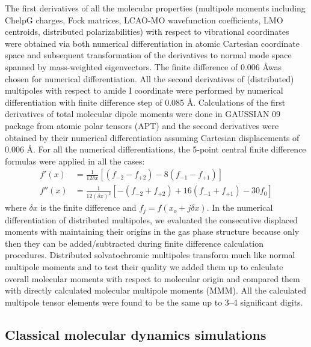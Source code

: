 \documentclass[a4paper,titlepage,twoside,fleqn,12pt]{book}
\begin{document}
\begin{appendices}
\begin{refsection}
The first derivatives of all the molecular properties
(multipole moments including ChelpG charges, Fock matrices, LCAO\hyp{}MO
wavefunction coefficients, LMO centroids, distributed polarizabilities)
with respect to
vibrational coordinates were obtained via both numerical differentiation
in atomic Cartesian coordinate space and subsequent
transformation of the derivatives to normal mode space
spanned by mass\hyp{}weighted eigenvectors. The finite difference
of 0.006 \AA was chosen for numerical differentiation. All the
second derivatives of (distributed) multipoles with respect to
amide I coordinate were performed by numerical differentiation
with finite difference step of 0.085 \AA. Calculations
of the first derivatives of total molecular dipole moments
were done in GAUSSIAN 09 package from atomic polar
tensors (APT) and the second derivatives were obtained by
their numerical differentiation assuming Cartesian displacements
of 0.006 \AA. For all the numerical differentiations, the
5\hyp{}point central finite difference formulas were applied in all the
cases:
%
\begin{subequations}
 \begin{align}
   f'(x) &= \frac{1}{12\delta x} \left[
 \left( f_{-2} - f_{+2} \right) - 
8\left( f_{-1} - f_{+1} \right)
\right] \\
  f''(x) &= \frac{1}{12(\delta x)^2} \left[
 -\left( f_{-2} + f_{+2} \right) + 
16\left( f_{-1} + f_{+1} \right) - 30f_0
\right]
 \end{align}
\end{subequations}
%
where $\delta x$ is the finite difference and $f_j = f(x_o + j\delta x)$. 
In the
numerical differentiation of distributed multipoles, we evaluated
the consecutive displaced moments with maintaining
their origins in the gas phase structure because only then they
can be added/subtracted during finite difference calculation
procedures. Distributed solvatochromic multipoles transform
much like normal multipole moments and to test their quality
we added them up to calculate overall molecular moments
with respect to molecular origin and compared them with directly
calculated molecular multipole moments (MMM). All
the calculated multipole tensor elements were found to be the
same up to 3--4 significant digits.

\subsection{Classical molecular dynamics simulations}


\end{refsection}
\end{appendices}
\end{document}
